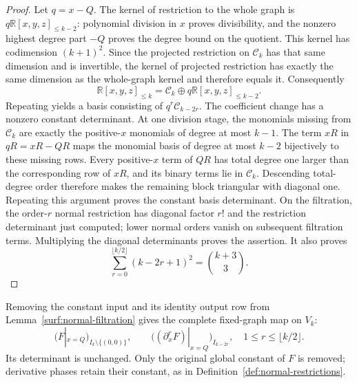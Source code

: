 \documentclass[11pt]{amsart}
\theoremstyle{definition}
\theoremstyle{remark}
\numberwithin{equation}{section}
\begin{document}
\begin{proof}
Let $q=x-Q$. The kernel of restriction to the whole graph is $q\mathbb R[x,y,z]_{\le k-2}$: polynomial division in $x$ proves divisibility, and the nonzero highest degree part $-Q$ proves the degree bound on the quotient. This kernel has codimension $(k+1)^2$. Since the projected restriction on $\mathcal C_k$ has that same dimension and is invertible, the kernel of projected restriction has exactly the same dimension as the whole-graph kernel and therefore equals it. Consequently
\[
 \mathbb R[x,y,z]_{\le k}=\mathcal C_k\oplus q\mathbb R[x,y,z]_{\le k-2}.
\]
Repeating yields a basis consisting of $q^r\mathcal C_{k-2r}$. The coefficient change has a nonzero constant determinant. At one division stage, the monomials missing from $\mathcal C_k$ are exactly the positive-$x$ monomials of degree at most $k-1$. The term $xR$ in $qR=xR-QR$ maps the monomial basis of degree at most $k-2$ bijectively to these missing rows. Every positive-$x$ term of $QR$ has total degree one larger than the corresponding row of $xR$, and its binary terms lie in $\mathcal C_k$. Descending total-degree order therefore makes the remaining block triangular with diagonal one. Repeating this argument proves the constant basis determinant. On the filtration, the order-$r$ normal restriction has diagonal factor $r!$ and the restriction determinant just computed; lower normal orders vanish on subsequent filtration terms. Multiplying the diagonal determinants proves the assertion. It also proves
\[
 \sum_{r=0}^{\lfloor k/2\rfloor}(k-2r+1)^2=\binom{k+3}{3}.
\]
\end{proof}

Removing the constant input and its identity output row from Lemma~\ref{surf:normal-filtration} gives the complete fixed-graph map on $V_k$:
\begin{equation}\label{low:78:h3n:filtration-map}
 (F|_{x=Q})_{I_k\setminus\{(0,0)\}},\qquad
 \bigl((\partial_x^rF)|_{x=Q}\bigr)_{I_{k-2r}},\quad 1\le r\le\lfloor k/2\rfloor.
\end{equation}
Its determinant is unchanged. Only the original global constant of $F$ is removed; derivative phases retain their constant, as in Definition~\ref{def:normal-restrictions}.
\end{document}
